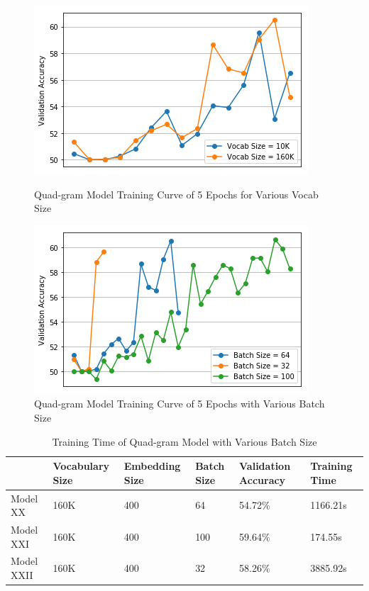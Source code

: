 \documentclass[10pt]{article}
\begin{document}
\begin{figure}[h]
\centering
\begin{minipage}{.4\textwidth}
  \includegraphics[width=\textwidth]{plot11}
  \caption{Quad-gram Model Training Curve of 5 Epochs for Various Vocab Size}
\end{minipage}%
\hfill
\begin{minipage}{.4\textwidth}
  \includegraphics[width=\textwidth]{plot12}
  \caption{Quad-gram Model Training Curve of 5 Epochs with Various Batch Size}
\end{minipage}
\end{figure}


\begin{table}[h]
\centering
\caption{Training Time of Quad-gram Model with Various Batch Size}
\label{my-label}
\begin{tabular}{llllll}
\hline
                                & Vocabulary Size & Embedding Size & Batch Size & Validation Accuracy & Training Time \\ \hline
\multicolumn{1}{l|}{Model XX}   & 160K            & 400            & 64         & 54.72\%             & 1166.21s        \\
\multicolumn{1}{l|}{Model XXI}  & 160K            & 400            & 100        & 59.64\%             & 174.55s       \\
\multicolumn{1}{l|}{Model XXII} & 160K            & 400            & 32         & 58.26\%             & 3885.92s      \\ \hline
\end{tabular}
\end{table}
\end{document}
